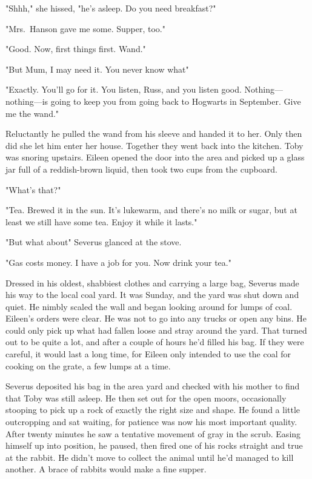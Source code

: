 "Shhh," she hissed, "he's asleep. Do you need breakfast?"

"Mrs.~Hanson gave me some. Supper, too."

"Good. Now, first things first. Wand."

"But Mum, I may need it. You never know what{\el}"

"Exactly. You'll go for it. You listen, Russ, and you listen good. Nothing—nothing—is going to keep you from going back to Hogwarts in September. Give me the wand."

Reluctantly he pulled the wand from his sleeve and handed it to her. Only then did she let him enter her house. Together they went back into the kitchen. Toby was snoring upstairs. Eileen opened the door into the area and picked up a glass jar full of a reddish-brown liquid, then took two cups from the cupboard.

"What's that?"

"Tea. Brewed it in the sun. It's lukewarm, and there's no milk or sugar, but at least we still have some tea. Enjoy it while it lasts."

"But what about{\el}" Severus glanced at the stove.

"Gas costs money. I have a job for you. Now drink your tea."

Dressed in his oldest, shabbiest clothes and carrying a large bag, Severus made his way to the local coal yard. It was Sunday, and the yard was shut down and quiet. He nimbly scaled the wall and began looking around for lumps of coal. Eileen's orders were clear. He was not to go into any trucks or open any bins. He could only pick up what had fallen loose and stray around the yard. That turned out to be quite a lot, and after a couple of hours he'd filled his bag. If they were careful, it would last a long time, for Eileen only intended to use the coal for cooking on the grate, a few lumps at a time.

Severus deposited his bag in the area yard and checked with his mother to find that Toby was still asleep. He then set out for the open moors, occasionally stooping to pick up a rock of exactly the right size and shape. He found a little outcropping and sat waiting, for patience was now his most important quality. After twenty minutes he saw a tentative movement of gray in the scrub. Easing himself up into position, he paused, then fired one of his rocks straight and true at the rabbit. He didn't move to collect the animal until he'd managed to kill another. A brace of rabbits would make a fine supper.

